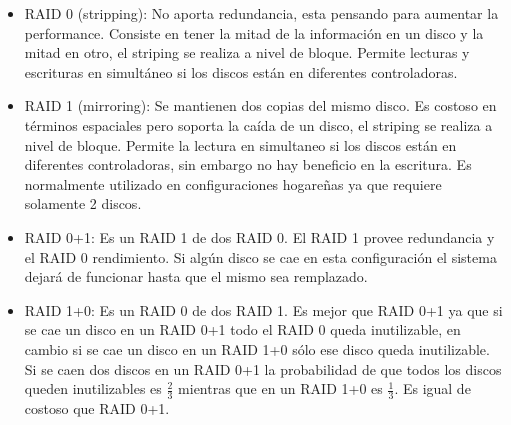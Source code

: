 \documentclass{article}
\begin{document}
\begin{itemize}
\item RAID 0 (stripping): No aporta redundancia, esta pensando para aumentar la performance. Consiste en tener la mitad de la informaci\'on en un disco y la mitad en otro, el striping se realiza a nivel de bloque. Permite lecturas y escrituras en simult\'aneo si los discos est\'an en diferentes controladoras.
\item RAID 1 (mirroring): Se mantienen dos copias del mismo disco. Es costoso en términos espaciales pero soporta la caída de un disco, el striping se realiza a nivel de bloque. Permite la lectura en simultaneo si los discos están en diferentes controladoras, sin embargo no hay beneficio en la escritura. Es normalmente utilizado en configuraciones hogareñas ya que requiere solamente 2 discos.
\item RAID 0+1: Es un RAID 1 de dos RAID 0. El RAID 1 provee redundancia y el RAID 0 rendimiento. Si algún disco se cae en esta configuración el sistema dejará de funcionar hasta que el mismo sea remplazado.
\item RAID 1+0: Es un RAID 0 de dos RAID 1. Es mejor que RAID 0+1 ya que si se cae un disco en un RAID 0+1 todo el RAID 0 queda inutilizable, en cambio si se cae un disco en un RAID 1+0 s\'olo ese disco queda inutilizable. Si se caen dos discos en un RAID 0+1 la probabilidad de que todos los discos queden inutilizables es $\frac{2}{3}$ mientras que en un RAID 1+0 es $\frac{1}{3}$. Es igual de costoso que RAID 0+1.


\end{itemize}
\end{document}
